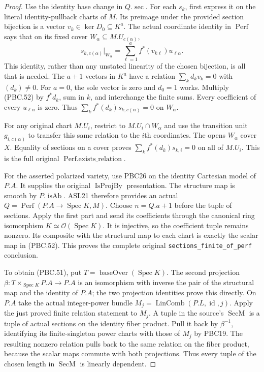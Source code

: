 \begin{proof}
Use the identity base change in $Q.\operatorname{sec}$.
For each $s_k$, first express it on the literal identity-pullback
charts of $M$.  Its preimage under the provided section
bijection is a vector $v_k\in\ker D_0\subseteq K^a$.
The actual coordinate identity in $\operatorname{Perf}$ says
that on its fixed cover $W_\alpha\subseteq M.U_{c(\alpha)}$,
\[
 s_{k,c(\alpha)}|_{W_\alpha}
    =\sum_{\ell=1}^{a} f^*(v_{k\ell})u_{\ell\alpha}.
                                                        \tag{PBC.52}
\]
This identity, rather than any unstated linearity of the
chosen bijection, is all that is needed.
The $a+1$ vectors in $K^a$ have a relation
$\sum_k d_kv_k=0$ with $(d_k)\ne0$.
For $a=0$, the sole vector is zero and $d_0=1$ works.
Multiply (PBC.52) by $f^*d_k$, sum in $k$, and interchange
the finite sums.  Every coefficient of every
$u_{\ell\alpha}$ is zero.  Thus
$\sum_k f^*(d_k)s_{k,c(\alpha)}=0$ on $W_\alpha$.

For any original chart $M.U_i$, restrict to
$M.U_i\cap W_\alpha$ and use the transition unit
$g_{i,c(\alpha)}$ to transfer this same relation to the
$i$th coordinates.  The opens $W_\alpha$ cover $X$.
Equality of sections on a cover proves
$\sum_k f^*(d_k)s_{k,i}=0$ on all of $M.U_i$.
This is the full original $\operatorname{Perf.exists\_relation}$.

For the asserted polarized variety, use PBC26 on the
identity Cartesian model of $P.A$.  It supplies the
original $\operatorname{IsProjBy}$ presentation.
The structure map is smooth by $P.\operatorname{isAb}$.
ASL21 therefore provides an actual
$Q=\operatorname{Perf}(P.A\to\operatorname{Spec}K,M)$.
Choose $n=Q.a+1$ before the tuple of sections.
Apply the first part and send its coefficients through the
canonical ring isomorphism
$K\simeq\mathcal O(\operatorname{Spec}K)$.
It is injective, so the coefficient tuple remains nonzero.
Its composite with the structural map to each chart is
exactly the scalar map in (PBC.52).
This proves the complete original
\texttt{sections\_finite\_of\_perf} conclusion.

To obtain (PBC.51), put $T=\operatorname{baseOver}(\operatorname{Spec}K)$.
The second projection
$\beta:T\times_{\operatorname{Spec}K}P.A\to P.A$
is an isomorphism with inverse the pair of the structural
map and the identity of $P.A$; the two projection identities
prove this directly.
On $P.A$ take the actual integer-power bundle
$M_j=\operatorname{LinComb}(P.L,\operatorname{id},j)$.
Apply the just proved finite relation statement to $M_j$.
A tuple in the source's $\operatorname{SecM}$ is a tuple
of actual sections on the identity fiber product.
Pull it back by $\beta^{-1}$, identifying its finite-singleton
power charts with those of $M_j$ by PBC19.
The resulting nonzero relation pulls back to the same
relation on the fiber product, because the scalar maps
commute with both projections.  Thus every tuple of the
chosen length in $\operatorname{SecM}$ is linearly dependent.


\end{proof}
